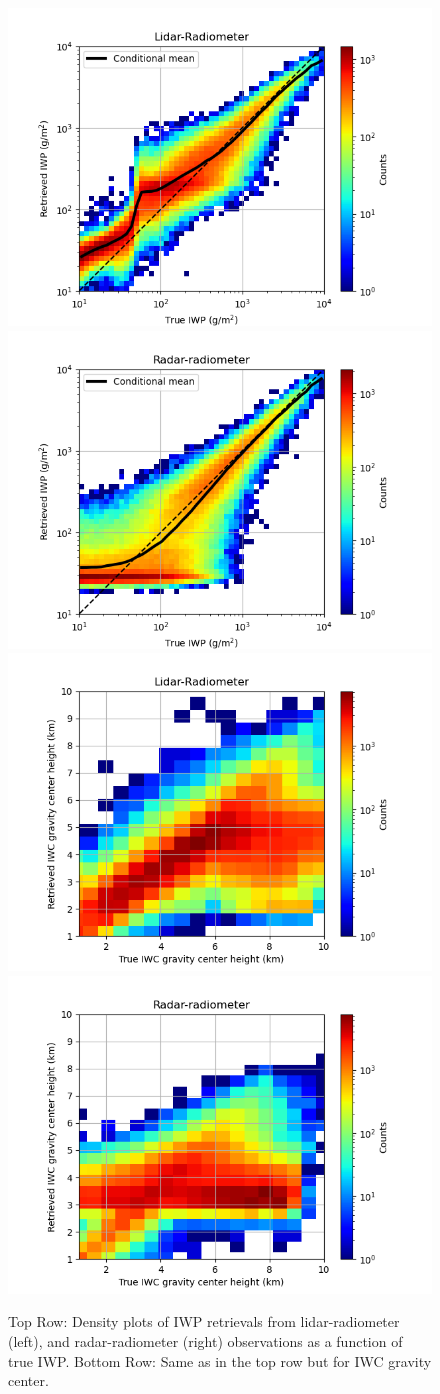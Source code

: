 \documentclass{ametsocV6.1}
\begin{document}
\begin{figure}
    \centering
    \includegraphics[width=.481\linewidth]{fig11a.rev.png}
    \includegraphics[width=.481\linewidth]{fig11b.rev.png}
    \includegraphics[width=.481\linewidth]{fig11c.rev.png}
    \includegraphics[width=.481\linewidth]{fig11d.rev.png}
    \caption{Top Row: Density plots of IWP retrievals from lidar-radiometer (left), and radar-radiometer (right) observations as a function
    of true IWP. Bottom Row: Same as in the top row but for IWC gravity center.}\label{f11}
\end{figure}

\end{document}
